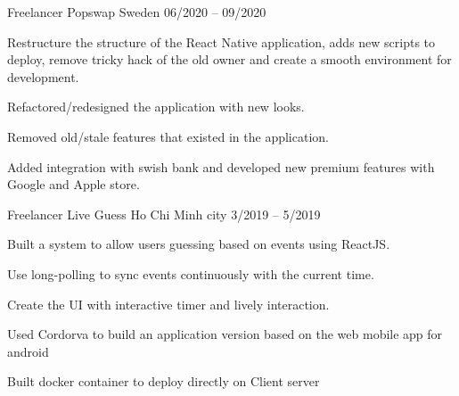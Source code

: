 \begin{cventries}
  \cventry
    {Freelancer} %
    {Popswap} %
    {Sweden} %
    {06/2020 -- 09/2020} %
    {
      \begin{cvitems} %
        \item {Restructure the structure of the React Native application, adds new scripts to deploy, remove tricky hack of the old owner and create a smooth environment for development.}
        \item {Refactored/redesigned the application with new looks.}
        \item {Removed old/stale features that existed in the application.}
        \item {Added integration with swish bank and developed new premium features with Google and Apple store. }
      \end{cvitems}
    }
    

  \cventry
    {Freelancer} %
    {Live Guess} %
    {Ho Chi Minh city} %
    {3/2019 -- 5/2019} %
    {
      \begin{cvitems} %
        \item {Built a system to allow users guessing based on  events using ReactJS.}
        \item {Use long-polling to sync events continuously with the current time.}
        \item{Create the UI with interactive timer and lively interaction.}
        \item{Used Cordorva to build an application version based on the web mobile app for android}
        \item {Built docker container to deploy directly on Client server}
      \end{cvitems}
    }

\end{cventries}
